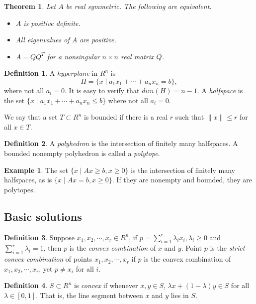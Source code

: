 \documentclass[11pt]{article} %
\theoremstyle{plain}%
\newtheorem{thm}{Theorem}[section]
\theoremstyle{definition}
\newtheorem{dfn}{Definition}[section]
\newtheorem{exmp}{Example}[section]
\theoremstyle{remark}
\begin{document}
\begin{thm}
Let $A$ be real symmetric. The following are equivalent. 
\begin{itemize}
\item $A$ is positive definite.
\item All eigenvalues of $A$ are positive. 
\item $A = QQ^T$ for a nonsingular $n\times n$ real matrix $Q$. 
\end{itemize}
\end{thm}

\begin{dfn}
A \emph{hyperplane} in $R^n$ is 
$$ H = \{ x \mid a_1 x_1 + \cdots + a_n x_n = b \}, $$
where not all $a_i = 0$. It is easy to verify that $dim(H) = n - 1$. 
A \emph{halfspace} is the set $\{ x \mid a_1 x_1 + \cdots + a_n x_n \leq b \}$ 
where not all $a_i = 0$. 
\end{dfn}

We say that a set $T \subset R^n$ is bounded if there is a real $r$ such that
$\parallel x\parallel \leq r$ for all $x \in T$. 

\begin{dfn}
A \emph{polyhedron} is the intersection of finitely many halfspaces. A bounded 
nonempty polyhedron is called a \emph{polytope}. 
\end{dfn}

\begin{exmp}
The set $\{ x \mid Ax \geq b, x \geq 0\}$ is the intersection of finitely many halfspaces, 
as is $\{ x \mid Ax = b, x\geq 0\}$. If they are nonempty and bounded, they are 
polytopes. 
\end{exmp}

\subsection{Basic solutions}

\begin{dfn}
Suppose $x_1, x_2, \cdots, x_r \in R^n$, if $p = \sum^r_{i=1} \lambda_i x_i, \lambda_i \geq 0$ 
and $\sum^r_{i=1} \lambda_i = 1$, then $p$ is the \emph{convex combination} 
of $x$ and $y$. Point $p$ is the \emph{strict convex combination} of points
$ x_1, x_2, \cdots, x_r$ if $p$ is the convex combination of $ x_1, x_2, \cdots, x_r$, 
yet $p \neq x_i$ for all $i$. 
\end{dfn}

\begin{dfn}
$S \subset R^n$ is \emph{convex} if whenever $x, y \in S$, $\lambda x + (1-\lambda)y \in S$ 
for all $\lambda \in [0, 1]$. That is, the line segment between $x$ and $y$ lies in $S$. 
\end{dfn}
\end{document}
